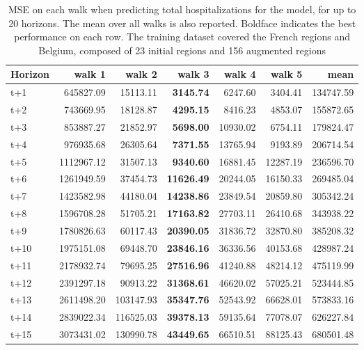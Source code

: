 \begin{table}[H]
\centering
\caption{MSE on each walk when predicting total hospitalizations for the model, for up to 20 horizons. The mean over all walks is also reported. Boldface indicates the best performance on each row. The training dataset covered the French regions and Belgium, composed of 23 initial regions and 156 augmented regions }
\label{tab:MSE_walk_custom_linear_regression}
\begin{tabular}{lrrrrrr}
\toprule
Horizon &     walk 1 &    walk 2 &   walk 3 &    walk 4 &    walk 5 &      mean \\
\midrule
t+1  & 645827.09  & 15113.11  & \textbf{3145.74}  & 6247.60  & 3404.41  & 134747.59  \\
t+2  & 743669.95  & 18128.87  & \textbf{4295.15}  & 8416.23  & 4853.07  & 155872.65  \\
t+3  & 853887.27  & 21852.97  & \textbf{5698.00}  & 10930.02  & 6754.11  & 179824.47  \\
t+4  & 976935.68  & 26305.64  & \textbf{7371.55}  & 13765.94  & 9193.89  & 206714.54  \\
t+5  & 1112967.12  & 31507.13  & \textbf{9340.60}  & 16881.45  & 12287.19  & 236596.70  \\
t+6  & 1261949.59  & 37454.73  & \textbf{11626.49}  & 20244.05  & 16150.33  & 269485.04  \\
t+7  & 1423582.98  & 44180.04  & \textbf{14238.86}  & 23849.54  & 20859.80  & 305342.24  \\
t+8  & 1596708.28  & 51705.21  & \textbf{17163.82}  & 27703.11  & 26410.68  & 343938.22  \\
t+9  & 1780826.63  & 60117.43  & \textbf{20390.05}  & 31836.72  & 32870.80  & 385208.32  \\
t+10  & 1975151.08  & 69448.70  & \textbf{23846.16}  & 36336.56  & 40153.68  & 428987.24  \\
t+11  & 2178932.74  & 79695.25  & \textbf{27516.96}  & 41240.88  & 48214.12  & 475119.99  \\
t+12  & 2391297.18  & 90913.22  & \textbf{31368.61}  & 46620.02  & 57025.21  & 523444.85  \\
t+13  & 2611498.20  & 103147.93  & \textbf{35347.76}  & 52543.92  & 66628.01  & 573833.16  \\
t+14  & 2839022.34  & 116525.03  & \textbf{39378.13}  & 59135.64  & 77078.07  & 626227.84  \\
t+15  & 3073431.02  & 130990.78  & \textbf{43449.65}  & 66510.51  & 88125.43  & 680501.48  \\

\end{tabular}
\end{table}

